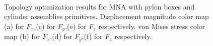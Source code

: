 \begin{figure}[hbt!]
                           \\
                                                                        
                          \caption{Topology optimization results for MNA with pylon boxes and cylinder assemblies primitives.  Displacement magnitude color map (a) for $F_x$,(c) for $F_y$,(e) for $F_z$ respectively.
                          von Mises stress color map (b) for $F_x$,(d) for $F_y$,(f) for $F_z$ respectively. \label{fig.3.47}} 
                      \end{figure}
                      \clearpage 
